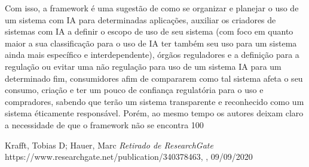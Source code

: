 \documentclass{article}
\begin{document}
Com isso, a framework é uma sugestão de como se organizar e planejar o uso de um sistema com IA para determinadas aplicações, auxiliar os criadores de sistemas com IA a definir o escopo de uso de seu sistema (com foco em quanto maior a sua classificação para o uso de IA ter também seu uso para um sistema ainda mais específico e interdependente), órgãos reguladores e a definição para a regulação ou evitar uma não regulação para uso de um sistema IA para um determinado fim, consumidores afim de compararem como tal sistema afeta o seu consumo, criação e ter um pouco de confiança regulatória para o uso e compradores, sabendo que terão um sistema transparente e reconhecido como um sistema éticamente responsável. Porém, ao mesmo tempo os autores deixam claro a necessidade de que o framework não se encontra 100%


\begin{thebibliography}{9}
Krafft, Tobias D; Hauer, Marc
\textit{Retirado de ResearchGate}
 https://www.researchgate.net/publication/340378463, , 09/09/2020
\end{thebibliography}
\end{document}
